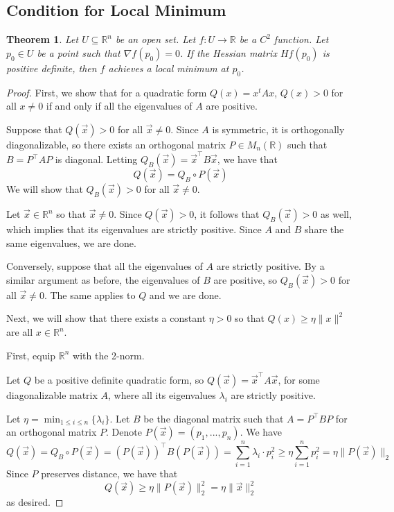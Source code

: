 \documentclass{article}
\theoremstyle{plain} %
\newtheorem{thm}{Theorem}
\numberwithin{thm}{section} %
\theoremstyle{definition}
\begin{document}
    \subsection{Condition for Local Minimum}
    \begin{thm}
        Let \(U \subseteq \mathbb{R}^n\) be an open set. Let \(f: U \to \mathbb{R}\) be a \(C^2\) function. Let \(p_0 \in U\) be a point such that \(\nabla f(p_0) = 0\). If the Hessian matrix \(Hf(p_0)\) is positive definite, then \(f\) achieves a local minimum at \(p_0\).
    \end{thm}
    \begin{proof}
        First, we show that for a quadratic form \(Q(x) = x^t A x\), \(Q(x) > 0\) for all \(x\neq 0\) if and only if all the eigenvalues of \(A\) are positive.

        Suppose that \(Q(\vec{x}) > 0\) for all \(\vec{x} \neq 0\). Since \(A\) is symmetric, it is orthogonally diagonalizable, so there exists an orthogonal matrix \(P \in M_n(\mathbb{R})\) such that \(B = P^{\top} A P\) is diagonal. Letting \(Q_B(\vec{x}) = \vec{x}^{\top} B \vec{x}\), we have that
        \[
            Q(\vec{x}) = Q_B \circ P (\vec{x})
        \]
        We will show that \(Q_B(\vec{x}) > 0\) for all \(\vec{x} \neq 0\).

        Let \(\vec{x} \in \mathbb{R}^n\) so that \(\vec{x} \neq 0\). Since \(Q(\vec{x}) > 0\), it follows that \(Q_B(\vec{x}) > 0\) as well, which implies that its eigenvalues are strictly positive. Since \(A\) and \(B\) share the same eigenvalues, we are done.

        Conversely, suppose that all the eigenvalues of \(A\) are strictly positive. By a similar argument as before, the eigenvalues of \(B\) are positive, so \(Q_B(\vec{x}) > 0\) for all \(\vec{x} \neq 0\). The same applies to \(Q\) and we are done.

        \medskip

        Next, we will show that there exists a constant \(\eta > 0\) so that \(Q(x) \geq \eta \|x\|^2\) are all \(x \in \mathbb{R}^n\).

        First, equip \(\mathbb{R}^n\) with the 2-norm.

        Let \(Q\) be a positive definite quadratic form, so \(Q(\vec{x}) = \vec{x}^{\top}A\vec{x}\), for some diagonalizable matrix \(A\), where all its eigenvalues \(\lambda _i\) are strictly positive.
        
        Let \(\eta = \min_{1 \leq i \leq n} \{\lambda _i\}\). Let \(B\) be the diagonal matrix such that \(A = P^{\top} B P\) for an orthogonal matrix \(P\). Denote \(P(\vec{x}) = (p_1, ..., p_n)\). We have
        \[
            Q(\vec{x}) = Q_B \circ P(\vec{x}) = (P(\vec{x}))^{\top}B(P(\vec{x})) = \sum_{i=1}^{n} \lambda_i \cdot p_i^2 \geq \eta \sum_{i=1}^{n} p_i^2 = \eta \lVert P(\vec{x}) \rVert _2
        \]
        Since \(P\) preserves distance, we have that
        \[
            Q(\vec{x}) \geq \eta \lVert P(\vec{x}) \rVert _2^2 = \eta \lVert \vec{x} \rVert _2^2
        \]
        as desired.


\end{proof}
\end{document}
